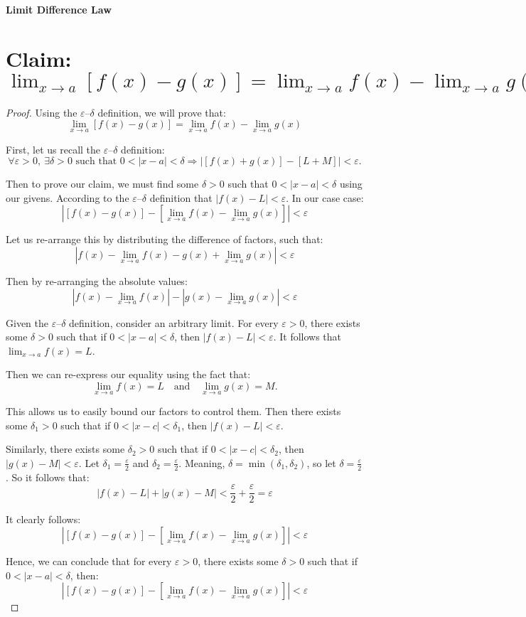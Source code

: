 \documentclass{article}
\begin{document}
\textbf{Limit Difference Law}

\section*{Claim: $\lim_{x \to a} [f(x) - g(x)] = \lim_{x \to a} f(x) - \lim_{x \to a} g(x)$}

	
\begin{proof}


Using the $\varepsilon$–$\delta$ definition, we will prove that: 
\[
\lim_{x \to a} [f(x) - g(x)] = \lim_{x \to a} f(x) - \lim_{x \to a} g(x)
\]


First, let us recall the $\varepsilon$–$\delta$ definition:
\[
\forall \varepsilon > 0, \ \exists \delta > 0 \text{ such that } 0 < |x - a| < \delta \Rightarrow \left| [f(x) + g(x)] - [L + M] \right| < \varepsilon.
\]


Then to prove our claim, we must find some $\delta > 0$ such that $0 < |x - a| < \delta$ using our givens. According to the $\varepsilon$–$\delta$ definition that $\left|f(x) - L\right| < \varepsilon$. In our case case: 
\[
\left| [f(x) - g(x)] - \left[\lim_{x \to a} f(x) - \lim_{x \to a} g(x) \right] \right| < \varepsilon
\]


Let us re-arrange this by distributing the difference of factors, such that:
\[
\left| f(x) - \lim_{x \to a} f(x) - g(x) + \lim_{x \to a} g(x) \right| < \varepsilon
\]


Then by re-arranging the absolute values:
\[
\left| f(x) - \lim_{x \to a} f(x) \right| - \left| g(x) - \lim_{x \to a} g(x) \right| < \varepsilon
\]


Given the $\varepsilon$--$\delta$ definition, consider an arbitrary limit. For every $\varepsilon > 0$, there exists some $\delta > 0$ such that if $0 < |x - a| < \delta$, then $|f(x) - L| < \varepsilon$. It follows that $\lim_{x \to a} f(x) = L$.


Then we can re-express our equality using the fact that:
\[
\lim_{x \to a} f(x) = L \quad \text{and} \quad \lim_{x \to a} g(x) = M.
\]


This allows us to easily bound our factors to control them. Then there exists some $\delta_1 > 0$ such that if $0 < |x - c| < \delta_1$, then $|f(x) - L| < \varepsilon$.  


Similarly, there exists some $\delta_2 > 0$ such that if $0 < |x - c| < \delta_2$, then $|g(x) - M| < \varepsilon$. Let $\delta_1 = \frac{\varepsilon}{2}$ and $\delta_2 = \frac{\varepsilon}{2}$. Meaning, $\delta = \min(\delta_1, \delta_2)$, so let $\delta = \frac{\varepsilon}{2}$. So it follows that:
\[
|f(x) - L| + |g(x) - M| < \frac{\varepsilon}{2} + \frac{\varepsilon}{2} = \varepsilon
\]


It clearly follows:
\[
\left| [f(x) - g(x)] - \left[\lim_{x \to a} f(x) - \lim_{x \to a} g(x) \right] \right| < \varepsilon
\]


Hence, we can conclude that for every $\varepsilon > 0$, there exists some $\delta > 0$ such that if $0 < |x - a| < \delta$, then: 
\[
\left| [f(x) - g(x)] - \left[\lim_{x \to a} f(x) - \lim_{x \to a} g(x) \right] \right| < \varepsilon
\]


\end{proof}
\end{document}
